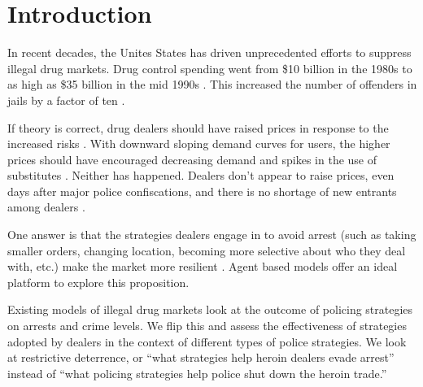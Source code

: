 \documentclass[runningheads,a4paper]{llncs}
\begin{document}
\section{Introduction}

In recent decades, the Unites States has driven unprecedented efforts to suppress illegal drug markets. Drug control spending went from \$10 billion in the 1980s to as high as \$35 billion in the mid 1990s \cite{maccoun_drug_2001,bouchard_resilience_2007}. This increased the number of offenders in jails by a factor of ten \cite{maccoun_drug_2001,bouchard_resilience_2007}.


If theory is correct, drug dealers should have raised prices in response to the increased risks \cite{reuter_risks_1986}. With downward sloping demand curves for users, the higher prices should have encouraged decreasing demand and spikes in the use of substitutes \cite{mas-colell_microeconomic_1995}. Neither has happened. Dealers don't appear to raise prices, even days after major police confiscations, and there is no shortage of new entrants among dealers \cite{bouchard_resilience_2007}.




One answer is that the strategies dealers engage in to avoid arrest (such as taking smaller orders, changing location, becoming more selective about who they deal with, etc.) make the market more resilient \cite{bouchard_resilience_2007}. Agent based models offer an ideal platform to explore this proposition.

Existing models of illegal drug markets look at the outcome of policing strategies on arrests and crime levels. We flip this and assess the effectiveness of strategies adopted by dealers in the context of different types of police strategies.
We look at restrictive deterrence, or “what strategies help heroin dealers evade arrest” instead of “what policing strategies help police shut down the heroin trade.”

\end{document}
